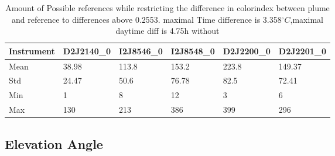 \begin{table}
	\begin{tabular}{|p{2cm}|p{2cm}|p{2cm}|p{2cm}|p{2cm}|p{2cm}|}
		Instrument	&D2J2140\_0&I2J8546\_0& I2J8548\_0&D2J2200\_0&D2J2201\_0\\
		\toprule
		Mean&38.98&113.8&153.2&223.8&149.37\\
		\midrule
		Std&
		24.47&
		50.6&
		76.78&
		82.5&
		72.41\\
		\midrule
		Min&1&8&12&3 &6\\
		\midrule
		Max&130&213&386&399 &296\\
		\bottomrule
	\end{tabular}
	\caption{Amount of Possible references while restricting the difference in colorindex  between plume and reference to differences above 0.2553. maximal Time difference is 3.358$^{\circ}C$,maximal daytime diff is 4.75h without}
\end{table}	

\subsection{Elevation Angle}


